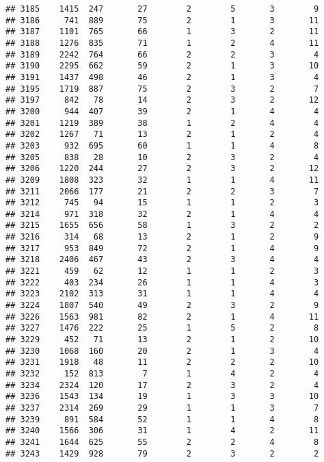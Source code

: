 \documentclass[]{article}
\begin{document}
\begin{verbatim}
## 3185    1415  247       27        2        5       3        9
## 3186     741  889       75        2        1       3       11
## 3187    1101  765       66        1        3       2       11
## 3188    1276  835       71        1        2       4       11
## 3189    2242  764       66        2        2       3        4
## 3190    2295  662       59        2        1       3       10
## 3191    1437  498       46        2        1       3        4
## 3195    1719  887       75        2        3       2        7
## 3197     842   78       14        2        3       2       12
## 3200     944  407       39        2        1       4        4
## 3201    1219  389       38        1        2       4        4
## 3202    1267   71       13        2        1       2        4
## 3203     932  695       60        1        1       4        8
## 3205     838   28       10        2        3       2        4
## 3206    1220  244       27        2        3       2       12
## 3209    1808  323       32        1        1       4       11
## 3211    2066  177       21        2        2       3        7
## 3212     745   94       15        1        1       2        3
## 3214     971  318       32        2        1       4        4
## 3215    1655  656       58        1        3       2        2
## 3216     314   68       13        2        1       2        9
## 3217     953  849       72        2        1       4        9
## 3218    2406  467       43        2        3       4        4
## 3221     459   62       12        1        1       2        3
## 3222     403  234       26        1        1       4        3
## 3223    2102  313       31        1        1       4        4
## 3224    1807  540       49        2        3       2        9
## 3226    1563  981       82        2        1       4       11
## 3227    1476  222       25        1        5       2        8
## 3229     452   71       13        2        1       2       10
## 3230    1068  160       20        2        1       3        4
## 3231    1918   48       11        2        2       2       10
## 3232     152  813        7        1        4       2        4
## 3234    2324  120       17        2        3       2        4
## 3236    1543  134       19        1        3       3       10
## 3237    2314  269       29        1        1       3        7
## 3239     891  584       52        1        1       4        8
## 3240    1566  306       31        1        4       2       11
## 3241    1644  625       55        2        2       4        8
## 3243    1429  928       79        2        3       2        2

\end{verbatim}
\end{document}
